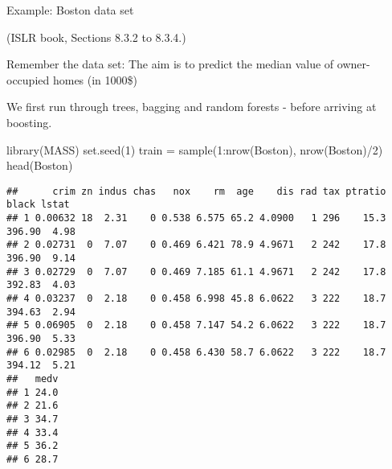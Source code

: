 \documentclass[
  10pt,
  ignorenonframetext,
]{beamer}
\newenvironment{Shaded}{\begin{snugshade}}{\end{snugshade}}
\newcommand{\DecValTok}[1]{\textcolor[rgb]{0.00,0.00,0.81}{#1}}
\newcommand{\FunctionTok}[1]{\textcolor[rgb]{0.00,0.00,0.00}{#1}}
\newcommand{\NormalTok}[1]{#1}
\newcommand{\OtherTok}[1]{\textcolor[rgb]{0.56,0.35,0.01}{#1}}
\newcommand{\SpecialCharTok}[1]{\textcolor[rgb]{0.00,0.00,0.00}{#1}}
\begin{document}
\begin{frame}[fragile]{Example: Boston data set}
\protect\hypertarget{example-boston-data-set}{}
\tiny

(ISLR book, Sections 8.3.2 to 8.3.4.)

\normalsize

Remember the data set: The aim is to predict the median value of
owner-occupied homes (in 1000\$)

We first run through trees, bagging and random forests - before arriving
at boosting.

\scriptsize

\begin{Shaded}
\begin{Highlighting}[]
\FunctionTok{library}\NormalTok{(MASS)}
\FunctionTok{set.seed}\NormalTok{(}\DecValTok{1}\NormalTok{)}
\NormalTok{train }\OtherTok{=} \FunctionTok{sample}\NormalTok{(}\DecValTok{1}\SpecialCharTok{:}\FunctionTok{nrow}\NormalTok{(Boston), }\FunctionTok{nrow}\NormalTok{(Boston)}\SpecialCharTok{/}\DecValTok{2}\NormalTok{)}
\FunctionTok{head}\NormalTok{(Boston)}
\end{Highlighting}
\end{Shaded}

\begin{verbatim}
##      crim zn indus chas   nox    rm  age    dis rad tax ptratio  black lstat
## 1 0.00632 18  2.31    0 0.538 6.575 65.2 4.0900   1 296    15.3 396.90  4.98
## 2 0.02731  0  7.07    0 0.469 6.421 78.9 4.9671   2 242    17.8 396.90  9.14
## 3 0.02729  0  7.07    0 0.469 7.185 61.1 4.9671   2 242    17.8 392.83  4.03
## 4 0.03237  0  2.18    0 0.458 6.998 45.8 6.0622   3 222    18.7 394.63  2.94
## 5 0.06905  0  2.18    0 0.458 7.147 54.2 6.0622   3 222    18.7 396.90  5.33
## 6 0.02985  0  2.18    0 0.458 6.430 58.7 6.0622   3 222    18.7 394.12  5.21
##   medv
## 1 24.0
## 2 21.6
## 3 34.7
## 4 33.4
## 5 36.2
## 6 28.7
\end{verbatim}
\end{frame}
\end{document}
